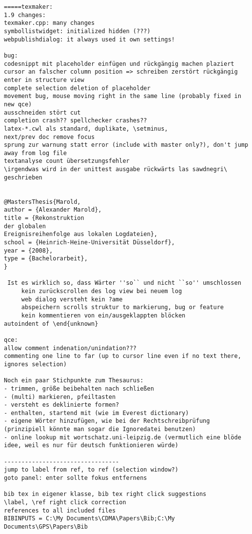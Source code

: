 \documentclass[10pt,a4paper,landscape]{report}
\begin{document}
\begin{verbatim}
=====texmaker: 
1.9 changes:
texmaker.cpp: many changes
symbollistwidget: initialized hidden (???)
webpublishdialog: it always used it own settings!

bug: 
codesnippt mit placeholder einfügen und rückgängig machen plaziert cursor an falscher column position => schreiben zerstört rückgängig
enter in structure view
complete selection deletion of placeholder
movement bug, mouse moving right in the same line (probably fixed in new qce)
ausschneiden stört cut
completion crash?? spellchecker crashes??
latex-*.cwl als standard, duplikate, \setminus, 
next/prev doc remove focus
sprung zur warnung statt error (include with master only?), don't jump away from log file
textanalyse count übersetzungsfehler
\irgendwas wird in der unittest ausgabe rückwärts las sawdnegri\ geschrieben


@MastersThesis{Marold,
author = {Alexander Marold},
title = {Rekonstruktion 
der globalen 
Ereignisreihenfolge aus lokalen Logdateien},
school = {Heinrich-Heine-Universität Düsseldorf},
year = {2008},
type = {Bachelorarbeit},
}

 Ist es wirklich so, dass Wärter ''so`` und nicht ``so'' umschlossen
     kein zurückscrollen des log view bei neuem log
     web dialog versteht kein ?ame
     abspeichern scrolls struktur to markierung, bug or feature
     kein kommentieren von ein/ausgeklappten blöcken
autoindent of \end{unknown}

qce:
allow comment indenation/unindation???
commenting one line to far (up to cursor line even if no text there, ignores selection)

Noch ein paar Stichpunkte zum Thesaurus:
- trimmen, größe beibehalten nach schließen
- (multi) markieren, pfeiltasten
- versteht es deklinierte formen?
- enthalten, startend mit (wie im Everest dictionary)
- eigene Wörter hinzufügen, wie bei der Rechtschreibprüfung (prinzipiell könnte man sogar die Ignoredatei benutzen)
- online lookup mit wortschatz.uni-leipzig.de (vermutlich eine blöde idee, weil es nur für deutsch funktionieren würde)

---------------------------------
jump to label from ref, to ref (selection window?)
goto panel: enter sollte fokus entfernens

bib tex in eigener klasse, bib tex right click suggestions
\label, \ref right click correction
references to all included files
BIBINPUTS = C:\My Documents\CDMA\Papers\Bib;C:\My Documents\GPS\Papers\Bib


\end{verbatim}
\end{document}
